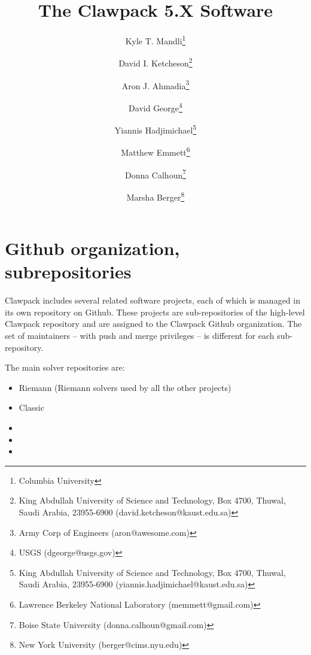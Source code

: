 \documentclass[]{siamltex}
\begin{document}
\ifpdf
{}
\else
{}
\fi

\title{The Clawpack 5.X Software}


\author{Kyle T. Mandli\thanks{
            Columbia University} \and
        David I. Ketcheson\thanks{
            King Abdullah University of Science and Technology, Box 4700, Thuwal, Saudi Arabia, 23955-6900 (\mbox{david.ketcheson@kaust.edu.sa})} \and
        Aron J. Ahmadia\thanks{
            Army Corp of Engineers (\mbox{aron@awesome.com})} \and
        David George\thanks{
            USGS (\mbox{dgeorge@usgs.gov})} \and
        Yiannis Hadjimichael\thanks{
            King Abdullah University of Science and Technology, Box 4700, Thuwal, Saudi Arabia, 23955-6900 (\mbox{yiannis.hadjimichael@kaust.edu.sa})} \and
        Matthew Emmett\thanks{
            Lawrence Berkeley National Laboratory (\mbox{memmett@gmail.com})} \and
        Donna Calhoun\thanks{
            Boise State University (\mbox{donna.calhoun@gmail.com})} \and
        Marsha Berger\thanks{
            New York University (\mbox{berger@cims.nyu.edu})}
        }

\maketitle


\section{Github organization, subrepositories}
Clawpack includes several related software projects, each of which is managed in its own repository on Github.  These projects are sub-repositories of the high-level Clawpack repository and are assigned to the Clawpack Github organization.  The set of maintainers -- with push and merge privileges -- is different for each sub-repository.  

The main solver repositories are:
\begin{itemize}
    \item Riemann (Riemann solvers used by all the other projects)
    \item Classic
    \item \amrclaw
    \item \geoclaw
    \item \pyclaw
\end{itemize}
\end{document}
